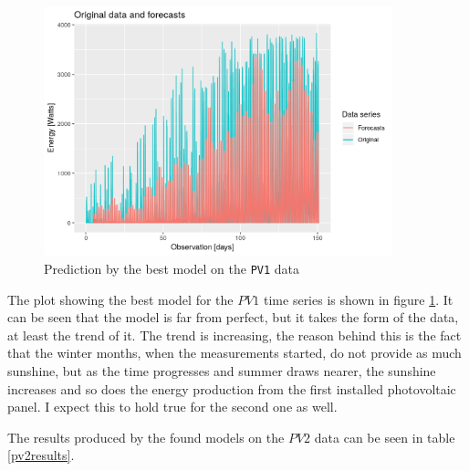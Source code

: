 \documentclass[12pt,a4paper,titlepage]{report}
\begin{document}
\begin{figure}[htbp]
    \centering
    \includegraphics[width=0.9\textwidth]{dbestpv1}
    \caption{Prediction by the best model on the \texttt{PV1} data}
    \label{dbestpv1}
\end{figure}

The plot showing the best model for the $ PV1 $ time series is shown in figure \ref{dbestpv1}. It can be seen that the model is far from perfect, but it takes the form of the data, at least the trend of it. The trend is increasing, the reason behind this is the fact that the winter months, when the measurements started, do not provide as much sunshine, but as the time progresses and summer draws nearer, the sunshine increases and so does the energy production from the first installed photovoltaic panel. I expect this to hold true for the second one as well.

The results produced by the found models on the $ PV2 $ data can be seen in table \ref{pv2results}.
\end{document}
